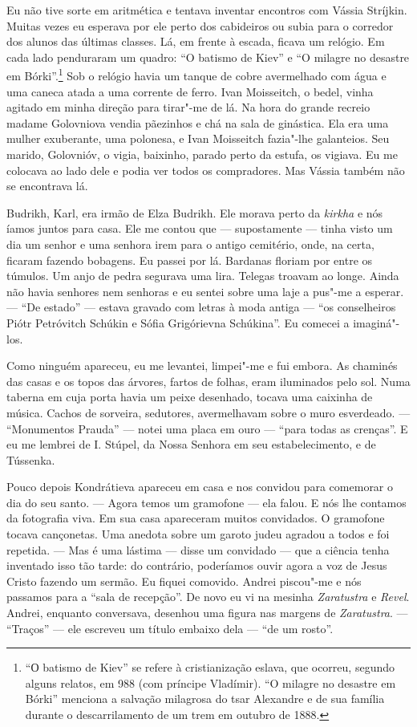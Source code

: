 Eu não tive sorte em aritmética e tentava inventar encontros com Vássia
Stríjkin. Muitas vezes eu esperava por ele perto dos cabideiros ou subia
para o corredor dos alunos das últimas classes. Lá, em frente à escada,
ficava um relógio. Em cada lado penduraram um quadro: ``O batismo de
Kiev'' e ``O milagre no desastre em Bórki''.\footnote{``О batismo de
  Kiev'' se refere à cristianização eslava, que ocorreu, segundo alguns
  relatos, em 988 (com príncipe Vladímir). ``O milagre no desastre em
  Bórki'' menciona a salvação milagrosa do tsar Alexandre \scalebox{.8}{III} e de sua
  família durante o descarrilamento de um trem em outubro de 1888.} Sob
o relógio havia um tanque de cobre avermelhado com água e uma caneca
atada a uma corrente de ferro. Ivan Moisseitch, o bedel, vinha agitado
em minha direção para tirar"-me de lá. Na hora do grande recreio madame
Golovniova vendia pãezinhos e chá na sala de ginástica. Ela era uma
mulher exuberante, uma polonesa, e Ivan Moisseitch fazia"-lhe galanteios.
Seu marido, Golovnióv, o vigia, baixinho, parado perto da estufa, os
vigiava. Eu me colocava ao lado dele e podia ver todos os compradores.
Mas Vássia também não se encontrava lá.

Budrikh, Karl, era irmão de Elza Budrikh. Ele morava perto da
\emph{kirkha} e nós íamos juntos para casa. Ele me contou que ---
supostamente --- tinha visto um dia um senhor e uma senhora irem para o
antigo cemitério, onde, na certa, ficaram fazendo bobagens. Eu passei
por lá. Bardanas floriam por entre os túmulos. Um anjo de pedra segurava
uma lira. Telegas troavam ao longe. Ainda não havia senhores nem
senhoras e eu sentei sobre uma laje a pus"-me a esperar. --- ``De
estado'' --- estava gravado com letras à moda antiga --- ``os
conselheiros Piótr Petróvitch Schúkin e Sófia Grigórievna Schúkina''. Eu
comecei a imaginá"-los.

Como ninguém apareceu, eu me levantei, limpei"-me e fui embora. As
chaminés das casas e os topos das árvores, fartos de folhas, eram
iluminados pelo sol. Numa taberna em cuja porta havia um peixe
desenhado, tocava uma caixinha de música. Cachos de sorveira, sedutores,
avermelhavam sobre o muro esverdeado. --- ``Monumentos Prauda'' ---
notei uma placa em ouro --- ``para todas as crenças''. E eu me lembrei
de I. Stúpel, da Nossa Senhora em seu estabelecimento, e de Tússenka.

Pouco depois Kondrátieva apareceu em casa e nos convidou para comemorar
o dia do seu santo. --- Agora temos um gramofone --- ela falou. E nós
lhe contamos da fotografia viva. Em sua casa apareceram muitos
convidados. O gramofone tocava cançonetas. Uma anedota sobre um garoto
judeu agradou a todos e foi repetida. --- Mas é uma lástima --- disse um
convidado --- que a ciência tenha inventado isso tão tarde: do
contrário, poderíamos ouvir agora a voz de Jesus Cristo fazendo um
sermão. Eu fiquei comovido. Andrei piscou"-me e nós passamos para a
``sala de recepção''. De novo eu vi na mesinha \emph{Zaratustra} e
\emph{Revel}. Andrei, enquanto conversava, desenhou uma figura nas
margens de \emph{Zaratustra}. --- ``Traços'' --- ele escreveu um título
embaixo dela --- ``de um rosto''.

